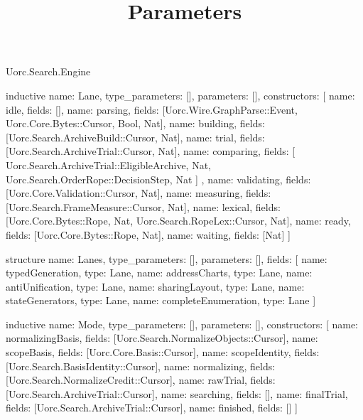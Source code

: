 \begin{lexlean}{Uorc.Search.Engine}
\title{Parameters}
\begin{semanticmodule}
inductive{
  name: Lane,
  type_parameters: [],
  parameters: [],
  constructors: [
    {name: idle, fields: []},
    {name: parsing, fields: [Uorc.Wire.GraphParse::Event, Uorc.Core.Bytes::Cursor, Bool, Nat]},
    {name: building, fields: [Uorc.Search.ArchiveBuild::Cursor, Nat]},
    {name: trial, fields: [Uorc.Search.ArchiveTrial::Cursor, Nat]},
    {
      name: comparing,
      fields: [
        Uorc.Search.ArchiveTrial::EligibleArchive,
        Nat,
        Uorc.Search.OrderRope::DecisionStep,
        Nat
      ]
    },
    {name: validating, fields: [Uorc.Core.Validation::Cursor, Nat]},
    {name: measuring, fields: [Uorc.Search.FrameMeasure::Cursor, Nat]},
    {name: lexical, fields: [Uorc.Core.Bytes::Rope, Nat, Uorc.Search.RopeLex::Cursor, Nat]},
    {name: ready, fields: [Uorc.Core.Bytes::Rope, Nat]},
    {name: waiting, fields: [Nat]}
  ]
}

structure{
  name: Lanes,
  type_parameters: [],
  parameters: [],
  fields: [
    {name: typedGeneration, type: Lane},
    {name: addressCharts, type: Lane},
    {name: antiUnification, type: Lane},
    {name: sharingLayout, type: Lane},
    {name: stateGenerators, type: Lane},
    {name: completeEnumeration, type: Lane}
  ]
}

inductive{
  name: Mode,
  type_parameters: [],
  parameters: [],
  constructors: [
    {name: normalizingBasis, fields: [Uorc.Search.NormalizeObjects::Cursor]},
    {name: scopeBasis, fields: [Uorc.Core.Basis::Cursor]},
    {name: scopeIdentity, fields: [Uorc.Search.BasisIdentity::Cursor]},
    {name: normalizing, fields: [Uorc.Search.NormalizeCredit::Cursor]},
    {name: rawTrial, fields: [Uorc.Search.ArchiveTrial::Cursor]},
    {name: searching, fields: []},
    {name: finalTrial, fields: [Uorc.Search.ArchiveTrial::Cursor]},
    {name: finished, fields: []}
  ]
}


\end{semanticmodule}
\end{lexlean}
